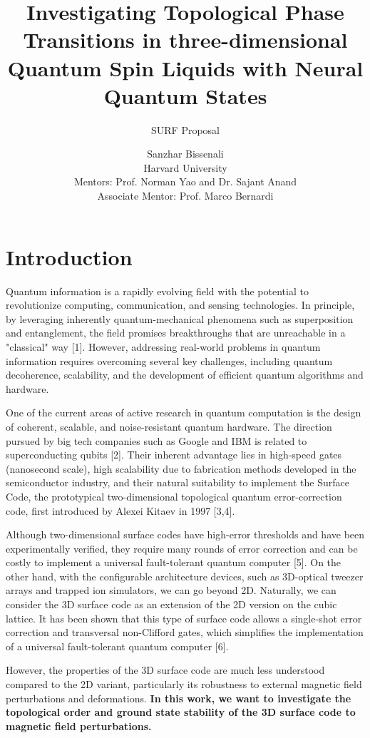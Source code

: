 \documentclass{article}
\title{Investigating Topological Phase Transitions in three-dimensional Quantum Spin Liquids with Neural Quantum States}
\author{SURF Proposal}
\date{Sanzhar Bissenali\\
Harvard University\\
Mentors: Prof. Norman Yao and Dr. Sajant Anand \\
Associate Mentor: Prof. Marco Bernardi
}
\begin{document}
\maketitle

\section{Introduction}
Quantum information is a rapidly evolving field with the potential to revolutionize computing, communication, and sensing technologies. In principle, by leveraging inherently quantum-mechanical phenomena such as superposition and entanglement, the field promises breakthroughs that are unreachable in a "classical" way [1]. However, addressing real-world problems in quantum information requires overcoming several key challenges, including quantum decoherence, scalability, and the development of efficient quantum algorithms and hardware.

One of the current areas of active research in quantum computation is the design of coherent, scalable, and noise-resistant quantum hardware. The direction pursued by big tech companies such as Google and IBM is related to superconducting qubits [2]. Their inherent advantage lies in high-speed gates (nanosecond scale), high scalability due to fabrication methods developed in the semiconductor industry, and their natural suitability to implement the Surface Code, the prototypical two-dimensional topological quantum error-correction code, first introduced by Alexei Kitaev in 1997 [3,4]. 

Although two-dimensional surface codes have high-error thresholds and have been experimentally verified, they require many rounds of error correction and can be costly to implement a universal fault-tolerant quantum computer [5]. On the other hand, with the configurable architecture devices, such as 3D-optical tweezer arrays and trapped ion simulators, we can go beyond 2D. Naturally, we can consider the 3D surface code as an extension of the 2D version on the cubic lattice. It has been shown that this type of surface code allows a single-shot error correction and transversal non-Clifford gates, which simplifies the implementation of a universal fault-tolerant quantum computer [6]. 

\pagebreak

However, the properties of the 3D surface code are much less understood compared to the 2D variant, particularly its robustness to external magnetic field perturbations and deformations. \textbf{In this work, we want to investigate the topological order and ground state stability of the 3D surface code to magnetic field perturbations.}
\end{document}
